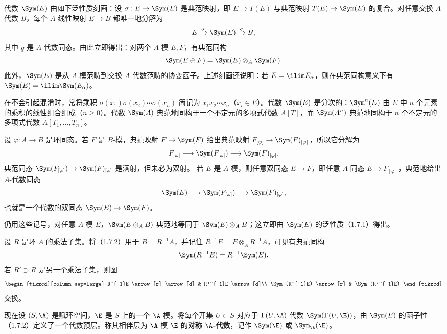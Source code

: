 代数 $\Sym(E)$ 由如下泛性质刻画：设 $\sigma:E\to\Sym(E)$ 是典范映射，即 $E\to T(E)$ 与典范映射 $T(E)\to\Sym(E)$ 的复合。对任意交换 $A$-代数 $B$，每个 $A$-线性映射 $E\to B$ 都唯一地分解为
\[
E\xrightarrow{\sigma}\Sym(E)\xrightarrow{g}B,
\]
其中 $g$ 是 $A$-代数同态。由此立即得出：对两个 $A$-模 $E,F$，有典范同构
\[
\Sym(E\oplus F)=\Sym(E)\otimes_A\Sym(F).
\]
此外，$\Sym(E)$ 是从 $A$-模范畴到交换 $A$-代数范畴的协变函子。上述刻画还说明：若 $E=\ilim E_\alpha$，则在典范同构意义下有
$\Sym(E)=\ilim\Sym(E_\alpha)$。

在不会引起混淆时，常将乘积 $\sigma(x_1)\sigma(x_2)\cdots\sigma(x_n)$ 简记为 $x_1x_2\cdots x_n$（$x_i\in E$）。代数 $\Sym(E)$ 是分次的：$\Sym^n(E)$ 由 $E$ 中 $n$ 个元素的乘积的线性组合组成（$n\geq0$）。代数 $\Sym(A)$ 典范地同构于一个不定元的多项式代数 $A[T]$，而 $\Sym(A^n)$ 典范地同构于 $n$ 个不定元的多项式代数 $A[T_1,\ldots,T_n]$。

设 $\varphi:A\to B$ 是环同态。若 $F$ 是 $B$-模，典范映射 $F\to\Sym(F)$ 给出典范映射
$F_{[\varphi]}\to\Sym(F)_{[\varphi]}$，所以它分解为
\[
F_{[\varphi]}\longrightarrow\Sym(F_{[\varphi]})
\longrightarrow\Sym(F)_{[\varphi]}.
\]
典范同态 $\Sym(F_{[\varphi]})\to\Sym(F)_{[\varphi]}$ 是满射，但未必为双射。
若 $E$ 是 $A$-模，则任意双同态 $E\to F$，即任意 $A$-同态 $E\to F_{[\varphi]}$，典范地给出 $A$-代数同态
\[
\Sym(E)\longrightarrow\Sym(F_{[\varphi]})\longrightarrow\Sym(F)_{[\varphi]},
\]
也就是一个代数的双同态 $\Sym(E)\to\Sym(F)$。

仍用这些记号，对任意 $A$-模 $E$，$\Sym(E\otimes_AB)$ 典范地等同于 $\Sym(E)\otimes_AB$；这立即由 $\Sym(E)$ 的泛性质（1.7.1）得出。

设 $R$ 是环 $A$ 的乘法子集。将（1.7.2）用于 $B=R^{-1}A$，并记住
$R^{-1}E=E\otimes_AR^{-1}A$，可见有典范同构
\[
\Sym(R^{-1}E)=R^{-1}\Sym(E).
\]
若 $R'\supset R$ 是另一个乘法子集，则图
\[
\begin{tikzcd}[column sep=large]
R^{-1}E \arrow[r] \arrow[d] & R'^{-1}E \arrow[d]\\
\Sym(R^{-1}E) \arrow[r] & \Sym(R'^{-1}E)
\end{tikzcd}
\]
交换。

现在设 $(S,\A)$ 是赋环空间，$\E$ 是 $S$ 上的一个 $\A$-模。将每个开集 $U\subset S$ 对应于 $\Gamma(U,\A)$-代数
$\Sym(\Gamma(U,\E))$，由 $\Sym(E)$ 的函子性（1.7.2）定义了一个代数预层。称其相伴层为 $\A$-模 $\E$ 的\textbf{对称 $\A$-代数}，记作 $\Sym(\E)$ 或 $\Sym_\A(\E)$。

